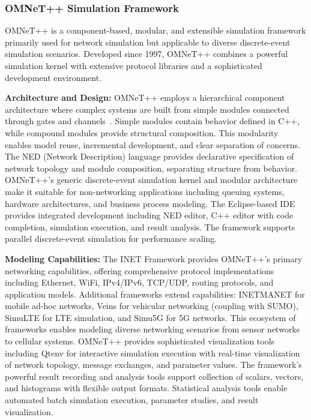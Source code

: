 \subsubsection{OMNeT++ Simulation Framework}

OMNeT++ is a component-based, modular, and extensible simulation framework primarily used for network simulation but applicable to diverse discrete-event simulation scenarios. Developed since 1997, OMNeT++ combines a powerful simulation kernel with extensive protocol libraries and a sophisticated development environment.

\textbf{Architecture and Design:} OMNeT++ employs a hierarchical component architecture where complex systems are built from simple modules connected through gates and channels~\cite{omnetpp_application}. Simple modules contain behavior defined in C++, while compound modules provide structural composition. This modularity enables model reuse, incremental development, and clear separation of concerns. The NED (Network Description) language provides declarative specification of network topology and module composition, separating structure from behavior. OMNeT++'s generic discrete-event simulation kernel and modular architecture make it suitable for non-networking applications including queuing systems, hardware architectures, and business process modeling. The Eclipse-based IDE provides integrated development including NED editor, C++ editor with code completion, simulation execution, and result analysis. The framework supports parallel discrete-event simulation for performance scaling.

\textbf{Modeling Capabilities:} The INET Framework provides OMNeT++'s primary networking capabilities, offering comprehensive protocol implementations including Ethernet, WiFi, IPv4/IPv6, TCP/UDP, routing protocols, and application models. Additional frameworks extend capabilities: INETMANET for mobile ad-hoc networks, Veins for vehicular networking (coupling with SUMO), SimuLTE for LTE simulation, and Simu5G for 5G networks. This ecosystem of frameworks enables modeling diverse networking scenarios from sensor networks to cellular systems. OMNeT++ provides sophisticated visualization tools including Qtenv for interactive simulation execution with real-time visualization of network topology, message exchanges, and parameter values. The framework's powerful result recording and analysis tools support collection of scalars, vectors, and histograms with flexible output formats. Statistical analysis tools enable automated batch simulation execution, parameter studies, and result visualization.

